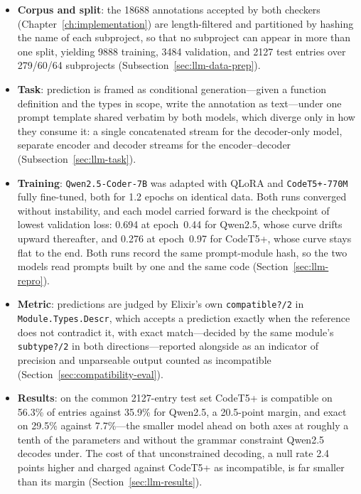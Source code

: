\begin{itemize}
    \item \textbf{Corpus and split}: the \num{18688} annotations accepted by both checkers (Chapter~\ref{ch:implementation}) are length-filtered and partitioned by hashing the name of each subproject, so that no subproject can appear in more than one split, yielding \num{9888} training, \num{3484} validation, and \num{2127} test entries over 279/60/64 subprojects (Subsection~\ref{sec:llm-data-prep}).
    \item \textbf{Task}: prediction is framed as conditional generation---given a function definition and the types in scope, write the annotation as text---under one prompt template shared verbatim by both models, which diverge only in how they consume it: a single concatenated stream for the decoder-only model, separate encoder and decoder streams for the encoder--decoder (Subsection~\ref{sec:llm-task}).
    \item \textbf{Training}: \texttt{Qwen2.5-Coder-7B} was adapted with QLoRA and \texttt{CodeT5+-770M} fully fine-tuned, both for 1.2 epochs on identical data. Both runs converged without instability, and each model carried forward is the checkpoint of lowest validation loss: \num{0.694} at epoch~\num{0.44} for Qwen2.5, whose curve drifts upward thereafter, and \num{0.276} at epoch~\num{0.97} for CodeT5+, whose curve stays flat to the end. Both runs record the same prompt-module hash, so the two models read prompts built by one and the same code (Section~\ref{sec:llm-repro}).
    \item \textbf{Metric}: predictions are judged by Elixir's own \texttt{compatible?/2} in \texttt{Module.Types.Descr}, which accepts a prediction exactly when the reference does not contradict it, with exact match---decided by the same module's \texttt{subtype?/2} in both directions---reported alongside as an indicator of precision and unparseable output counted as incompatible (Section~\ref{sec:compatibility-eval}).
    \item \textbf{Results}: on the common \num{2127}-entry test set CodeT5+ is compatible on \num{56.3}\% of entries against \num{35.9}\% for Qwen2.5, a \num{20.5}-point margin, and exact on \num{29.5}\% against \num{7.7}\%---the smaller model ahead on both axes at roughly a tenth of the parameters and without the grammar constraint Qwen2.5 decodes under. The cost of that unconstrained decoding, a null rate \num{2.4} points higher and charged against CodeT5+ as incompatible, is far smaller than its margin (Section~\ref{sec:llm-results}).

\end{itemize}
